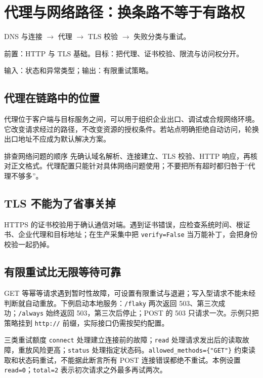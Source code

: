 \chapter{代理与网络路径：换条路不等于有路权}\label{ch:network}
\begin{tcolorbox}[title=章首知识地图,colframe=Ink]
DNS 与连接 $\longrightarrow$ 代理 $\longrightarrow$ TLS 校验 $\longrightarrow$ 失败分类与重试。
\end{tcolorbox}

\begin{tcolorbox}[title=学习目标与前置知识,colframe=Ink!65,colback=Ink!2]
前置：HTTP 与 TLS 基础。目标：把代理、证书校验、限流与访问权分开。\par
输入：状态和异常类型；输出：有限重试策略。
\end{tcolorbox}

\section{代理在链路中的位置}
代理位于客户端与目标服务之间，可以用于组织企业出口、调试或合规网络环境。它改变请求经过的路径，不改变资源的授权条件。若站点明确拒绝自动访问，轮换出口地址不应成为默认解决方案。

\begin{method}{排查网络问题的顺序}
先确认域名解析、连接建立、TLS 校验、HTTP 响应，再核对正文格式。代理配置只能针对具体网络问题使用；不要把所有超时都归咎于“代理不够多”。
\end{method}

\section{TLS 不能为了省事关掉}
HTTPS 的证书校验用于确认通信对端。遇到证书错误，应检查系统时间、根证书、企业代理和目标地址；在生产采集中把 \texttt{verify=False} 当万能补丁，会把身份校验一起扔掉。

\section{有限重试比无限等待可靠}
GET 等幂等请求遇到暂时性故障，可设置有限重试与退避；写入型请求不能未经判断就自动重放。下例启动本地服务：\texttt{/flaky} 两次返回 503、第三次成功；\texttt{/always} 始终返回 503，第三次后停止；POST 的 503 只请求一次。示例只把策略挂到 \texttt{http://} 前缀，实际接口仍需按契约配置。

\begin{method}{三类重试额度}
\texttt{connect} 处理建立连接前的故障；\texttt{read} 处理请求发出后的读取故障，重放风险更高；\texttt{status} 处理指定状态码。\texttt{allowed\_methods=\{"GET"\}} 约束读取和状态码重试，不能据此断言所有 POST 连接错误都绝不重试。本例设置 \texttt{read=0}；\texttt{total=2} 表示初次请求之外最多再试两次。
\end{method}

